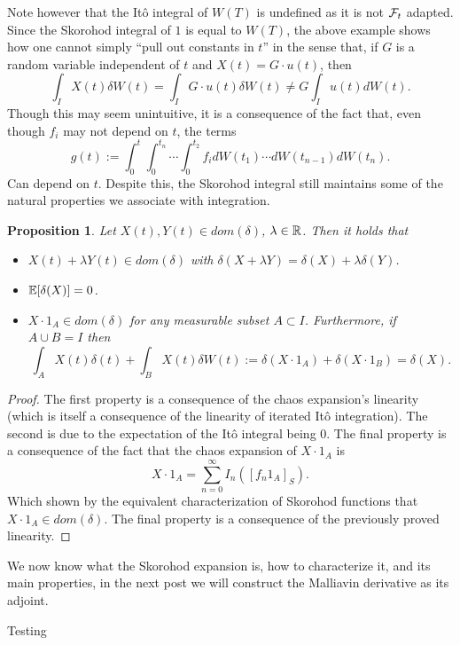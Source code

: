 \documentclass[12pt]{article}
\newtheorem{proposition}{Proposition}
\begin{document}
Note however that the Itô integral of $W(T)$ is undefined as it is not  $\mathcal{F}_t$ adapted. Since the Skorohod integral of $1$ is equal to  $W(T)$, the above example shows how one cannot simply ``pull out constants in $t$'' in the sense that, if $G$ is a random variable independent of  $t$ and  $X(t)=G\cdot u(t)$, then
\begin{equation*}
    \int_{I} X(t) \delta W(t)=\int_{I}G\cdot u(t)\delta W(t) \neq G\int_{I}u(t) dW(t).
\end{equation*}
Though this may seem unintuitive, it is a consequence of the fact that, even though $f_i$ may not depend on  $t$, the terms
\begin{equation*}
    g(t):=\int_{0}^t\int_{0}^{t_{n}}\cdots \int_{0}^{t_2} f_i dW(t_1)\cdots dW(t_{n-1})dW(t_n).
\end{equation*}
Can depend on $t$. Despite this, the Skorohod integral still maintains some of the natural properties we associate with integration.
\begin{proposition}
    Let $X(t), Y(t)\in dom(\delta)$, $\lambda \in {\mathbb R}$. Then it holds that
    \begin{itemize}
    	\item $X(t)+ \lambda Y(t) \in dom(\delta)$ with $\delta(X+\lambda Y)=\delta(X)+\lambda \delta(Y)$.
    	\item $\mathbb{E}[\delta(X)]=0$.
    	\item $X\cdot 1_A \in dom(\delta)$ for any measurable subset $A \subset I$. Furthermore, if $A \cup B =I$ then
    	      \begin{equation*}
    		      \int_{A}X(t) \delta(t)+ \int_{B}X(t)\delta W(t):=\delta(X\cdot 1_A)+\delta(X\cdot 1_B)=\delta(X).
    	      \end{equation*}

    \end{itemize}
\end{proposition}

\begin{proof}
    The first property is a consequence of the chaos expansion's linearity (which is itself  a consequence of the linearity of iterated Itô integration). The second is due to the expectation of the Itô integral being $0$. The final property is a consequence of the fact that the chaos expansion of $X\cdot 1_A$ is
    \begin{equation*}
    	X\cdot 1_A=\sum_{n=0}^{\infty} I_{n}([f_n 1_A]_S).
    \end{equation*}
    Which shown by the equivalent characterization of Skorohod functions that $X\cdot 1_A\in dom(\delta)$. The final property is a consequence of the previously proved linearity.
\end{proof}
We now know what the Skorohod expansion is, how to characterize it, and its main properties, in the next post we will construct the Malliavin derivative as its adjoint.





Testing
\end{document}
